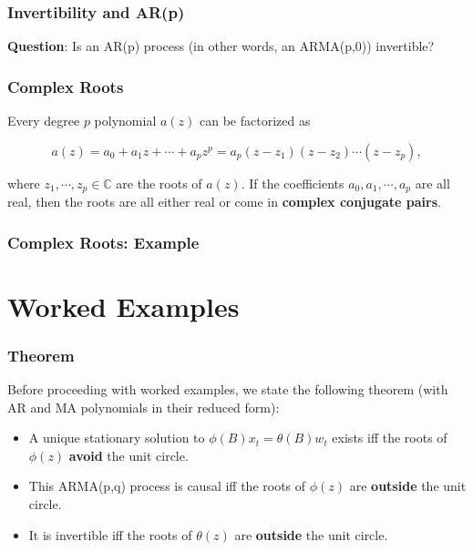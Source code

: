 \documentclass[%
xcolor=pdftex]{beamer}
\begin{document}
\begin{frame}
\frametitle{Invertibility and AR(p)}

\textbf{Question}: Is an AR(p) process (in other words, an ARMA(p,0)) invertible?

\vspace{40mm}

\end{frame}

\begin{frame}
\frametitle{Complex Roots}

Every degree $p$ polynomial $a(z)$ can be factorized as

$$
a(z) = a_0 + a_1 z + \cdots + a_p z^p = a_p(z-z_1)(z-z_2)\cdots(z-z_p),
$$

where $z_1, \cdots, z_p \in \mathbb{C}$ are the roots of $a(z)$. If the coefficients $a_0, a_1, \cdots, a_p$ are all real, then the roots are all either real or come in \textbf{complex conjugate pairs}.

\end{frame}

\begin{frame}
\frametitle{Complex Roots: Example}


\end{frame}

\section{Worked Examples}
\frame{\tableofcontents[currentsection]}

\begin{frame}
\frametitle{Theorem}

Before proceeding with worked examples, we state the following theorem (with AR and MA polynomials in their reduced form):

\begin{itemize}
\item A unique stationary solution to $\phi(B) x_t = \theta(B) w_t$ exists iff the roots of $\phi(z)$ \textbf{avoid} the unit circle.

\item This ARMA(p,q) process is causal iff the roots of $\phi(z)$ are \textbf{outside} the unit circle.

\item It is invertible iff the roots of $\theta(z)$ are \textbf{outside} the unit circle.
\end{itemize}
\end{frame}
\end{document}
